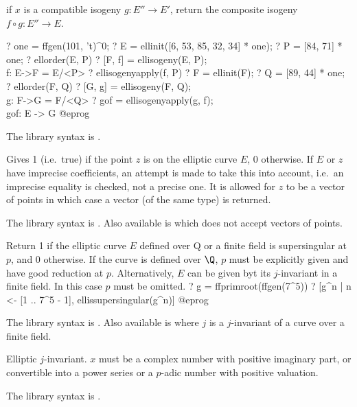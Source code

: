 \item if $x$ is a compatible isogeny $g:E''\to E'$, return the composite
isogeny $f \circ g:  E''\to E$.

\bprog
? one = ffgen(101, 't)^0;
? E = ellinit([6, 53, 85, 32, 34] * one);
? P = [84, 71] * one;
? ellorder(E, P)
? [F, f] = ellisogeny(E, P);  \\ f: E->F = E/<P>
? ellisogenyapply(f, P)
? F = ellinit(F);
? Q = [89, 44] * one;
? ellorder(F, Q)
? [G, g] = ellisogeny(F, Q); \\  g: F->G = F/<Q>
? gof = ellisogenyapply(g, f); \\ gof: E -> G
@eprog

The library syntax is .

\label{se:ellisoncurve}
Gives 1 (i.e.~true) if the point $z$ is on the elliptic curve $E$, 0
otherwise. If $E$ or $z$ have imprecise coefficients, an attempt is made to
take this into account, i.e.~an imprecise equality is checked, not a precise
one. It is allowed for $z$ to be a vector of points in which case a vector
(of the same type) is returned.

The library syntax is .
Also available is  which does not
accept vectors of points.

\label{se:ellissupersingular}
Return 1 if the elliptic curve $E$ defined over Q or a finite field is supersingular
at $p$, and $0$ otherwise.
If the curve is defined over $\Q$, $p$ must be explicitly given and have good
reduction at $p$.
Alternatively, $E$ can be given byt its $j$-invariant in a finite field. In
this case $p$ must be omitted.
\bprog
? g = ffprimroot(ffgen(7^5))
? [g^n | n <- [1 .. 7^5 - 1], ellissupersingular(g^n)]
@eprog

The library syntax is .
Also available is
 where $j$ is a $j$-invariant of a curve
over a finite field.

\label{se:ellj}
Elliptic $j$-invariant. $x$ must be a complex number
with positive imaginary part, or convertible into a power series or a
$p$-adic number with positive valuation.

The library syntax is .

